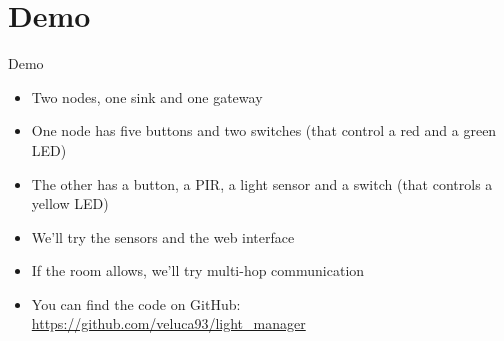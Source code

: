 \documentclass[italian]{beamer}
\begin{document}
\section{Demo}
\begin{frame}{Demo}
    \begin{itemize}
        \item<1-> Two nodes, one sink and one gateway
        \item<2-> One node has five buttons and two switches (that control a red and a green LED)
        \item<3-> The other has a button, a PIR, a light sensor and a switch (that controls a yellow LED)
        \item<4-> We'll try the sensors and the web interface
        \item<5-> If the room allows, we'll try multi-hop communication
        \item<6-> You can find the code on GitHub: \url{https://github.com/veluca93/light_manager}
    \end{itemize}
\end{frame}
\end{document}
